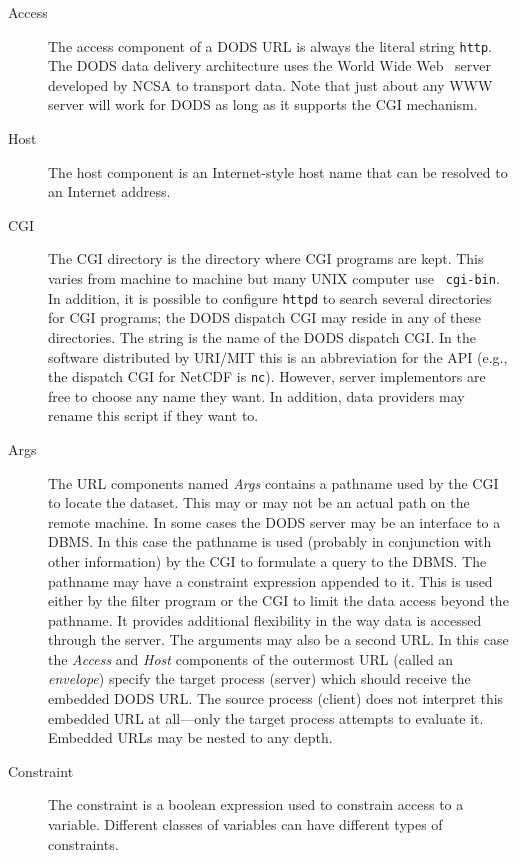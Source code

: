 \begin{description}

\item [Access] The access component of a DODS URL is always the
  literal string {\tt http}. The DODS data delivery architecture uses
  the World Wide Web \HTTPD\ server developed by NCSA to transport
  data. Note that just about any WWW server will work for DODS as long
  as it supports the CGI mechanism.

\item [Host] The host component is an Internet-style host name that
  can be resolved to an Internet address.
  
\item [CGI] The CGI directory is the directory where CGI programs are kept.
  This varies from machine to machine but many UNIX computer use {\tt
    cgi-bin}. In addition, it is possible to configure {\tt httpd} to search
  several directories for CGI programs; the DODS dispatch CGI may reside in
  any of these directories. The string is the name of the DODS dispatch
  CGI\@. In the software distributed by URI/MIT this is an abbreviation for
  the API (e.g., the dispatch CGI for NetCDF is {\tt nc}). However, server
  implementors are free to choose any name they want. In addition, data
  providers may rename this script if they want to.
  
\item [Args] The URL components named {\em Args\/} contains a pathname
  used by the CGI to locate the dataset. This may or may not be an
  actual path on the remote machine. In some cases the DODS server may
  be an interface to a DBMS\@. In this case the pathname is used
  (probably in conjunction with other information) by the CGI to
  formulate a query to the DBMS\@. The pathname may have a constraint
  expression appended to it. This is used either by the filter program
  or the CGI to limit the data access beyond the pathname. It provides
  additional flexibility in the way data is accessed through the
  server. The arguments may also be a second URL\@. In this case the
  {\em Access\/} and {\em Host\/} components of the outermost URL
  (called an {\em envelope\/}) specify the target process (server)
  which should receive the embedded DODS URL\@. The source process
  (client) does not interpret this embedded URL at all---only the
  target process attempts to evaluate it.  Embedded URLs may be nested
  to any depth.

\item [Constraint] The constraint is a boolean expression used to
  constrain access to a variable. Different classes of variables can
  have different types of constraints. 

\end{description}

